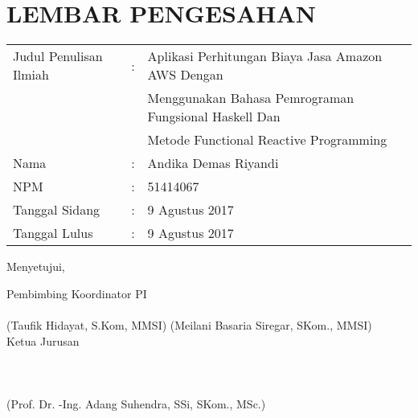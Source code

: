 \documentclass[pi.tex]{subfile}
\begin{document}
\chapter*{LEMBAR PENGESAHAN}

\begin{tabular}{lcl}
  Judul Penulisan Ilmiah &:& Aplikasi Perhitungan Biaya Jasa Amazon AWS Dengan \\ & & Menggunakan Bahasa Pemrograman Fungsional Haskell Dan \\ & & Metode Functional Reactive Programming \\
  Nama &:& Andika Demas Riyandi \\
  NPM &:& 51414067 \\
  Tanggal Sidang &:& 9 Agustus 2017 \\
  Tanggal Lulus &:& 9 Agustus 2017 \\
\end{tabular}


\hspace*{\fill}
        Menyetujui,
\hspace*{\fill}

\hspace*{\fill}
Pembimbing					                     Koordinator PI
\hspace*{\fill}\\
\\
(Taufik Hidayat, S.Kom, MMSI) 	(Meilani Basaria Siregar, SKom., MMSI) \\

\hspace*{\fill}
        Ketua Jurusan
\hspace*{\fill}
\\
\\
\\
\\
\hspace*{\fill}
        (Prof. Dr. -Ing. Adang Suhendra, SSi, SKom., MSc.)
\hspace*{\fill}
\end{document}

